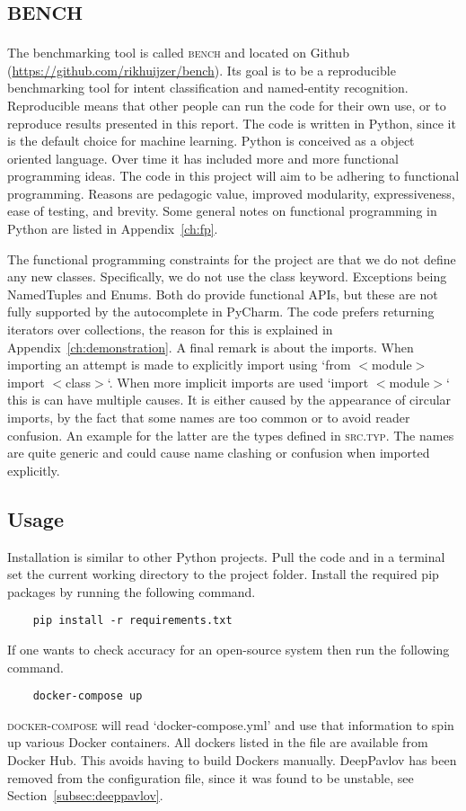 \chapter{\textsc{bench}}
\label{ch:bench}

The benchmarking tool is called \textsc{bench} and located on Github (\url{https://github.com/rikhuijzer/bench}).
Its goal is to be a reproducible benchmarking tool for intent classification and named-entity recognition.
Reproducible means that other people can run the code for their own use, or to reproduce results presented in this report.
The code is written in Python, since it is the default choice for machine learning.
Python is conceived as a object oriented language.
Over time it has included more and more functional programming ideas.
The code in this project will aim to be adhering to functional programming.
Reasons are pedagogic value, improved modularity, expressiveness, ease of testing, and brevity.
Some general notes on functional programming in Python are listed in Appendix~\ref{ch:fp}.

The functional programming constraints for the project are that we do not define any new classes.
Specifically, we do not use the class keyword.
Exceptions being NamedTuples and Enums.
Both do provide functional APIs, but these are not fully supported by the autocomplete in PyCharm.
The code prefers returning iterators over collections, the reason for this is explained in Appendix~\ref{ch:demonstration}.
A final remark is about the imports.
When importing an attempt is made to explicitly import using `from $<$module$>$ import $<$class$>$`.
When more implicit imports are used `import $<$module$>$` this is can have multiple causes.
It is either caused by the appearance of circular imports, by the fact that some names are too common or to avoid reader confusion.
An example for the latter are the types defined in \textsc{src.typ}.
The names are quite generic and could cause name clashing or confusion when imported explicitly.

\section{Usage}
\label{sec:usage}
Installation is similar to other Python projects.
Pull the code and in a terminal set the current working directory to the project folder.
Install the required pip packages by running the following command.
\begin{verbatim}
    pip install -r requirements.txt
\end{verbatim}
If one wants to check accuracy for an open-source system then run the following command.
\begin{verbatim}
    docker-compose up
\end{verbatim}
\textsc{docker-compose} will read `docker-compose.yml' and use that information to spin up various Docker containers.
All dockers listed in the file are available from Docker Hub.
This avoids having to build Dockers manually.
DeepPavlov has been removed from the configuration file, since it was found to be unstable, see Section~\ref{subsec:deeppavlov}.


